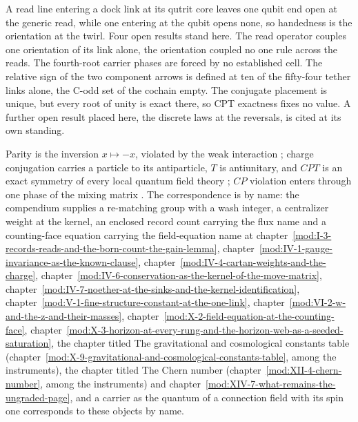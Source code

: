 A read line entering a dock link at its qutrit core leaves one qubit end open at the generic read, while one entering at the qubit opens none, so handedness is the orientation at the twirl.
Four open results stand here. The read operator couples one orientation of its link alone, the orientation coupled no one rule across the reads. The fourth-root carrier phases are forced by no established cell. The relative sign of the two component arrows is defined at ten of the fifty-four tether links alone, the C-odd set of the cochain empty. The conjugate placement is unique, but every root of unity is exact there, so CPT exactness fixes no value. A further open result placed here, the discrete laws at the reversals, is cited at its own standing.
\begin{chbridge}
Parity is the inversion $x \mapsto -x$, violated by the weak interaction \cite{Lee1956}; charge conjugation carries a particle to its antiparticle, $T$ is antiunitary, and $CPT$ is an exact symmetry of every local quantum field theory \cite{Luders1957,Jost1957,StreaterWightman1964}; $CP$ violation enters through one phase of the mixing matrix \cite{Kobayashi1973}. The correspondence is by name: the compendium supplies a re-matching group with a wash integer, a centralizer weight at the kernel, an enclosed record count carrying the flux name and a counting-face equation carrying the field-equation name at chapter~\ref{mod:I-3-records-reads-and-the-born-count-the-gain-lemma}, chapter~\ref{mod:IV-1-gauge-invariance-as-the-known-clause}, chapter~\ref{mod:IV-4-cartan-weights-and-the-charge}, chapter~\ref{mod:IV-6-conservation-as-the-kernel-of-the-move-matrix}, chapter~\ref{mod:IV-7-noether-at-the-sinks-and-the-kernel-identification}, chapter~\ref{mod:V-1-fine-structure-constant-at-the-one-link}, chapter~\ref{mod:VI-2-w-and-the-z-and-their-masses}, chapter~\ref{mod:X-2-field-equation-at-the-counting-face}, chapter~\ref{mod:X-3-horizon-at-every-rung-and-the-horizon-web-as-a-seeded-saturation}, the chapter titled The gravitational and cosmological constants table (chapter~\ref{mod:X-9-gravitational-and-cosmological-constants-table}, among the instruments), the chapter titled The Chern number (chapter~\ref{mod:XII-4-chern-number}, among the instruments) and chapter~\ref{mod:XIV-7-what-remains-the-ungraded-page}, and a carrier as the quantum of a connection field with its spin one corresponds to these objects by name.
\end{chbridge}
